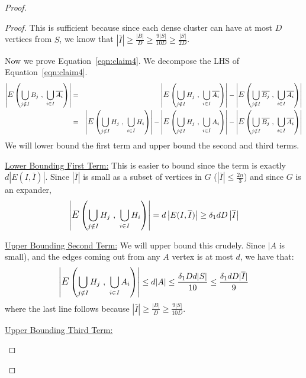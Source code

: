 \begin{proof}
\begin{description}
\begin{proof}
This is sufficient because since each dense cluster can have at most $D$ vertices from $S$, we know that $|\bar{I}| \ge \frac{|B|}{D} \ge \frac{9|S|}{10D} \ge \frac{|S|}{2D}$.

Now we prove Equation~\ref{eqn:claim4}. We decompose the LHS of Equation~\ref{eqn:claim4}.
\begin{eqnarray*}
\left| \mathlarger{E}\left(\bigcup_{j \notin I} B_j~,~\bigcup_{i \in I} \bar{A_i} \right) \right| & = &
\left| \mathlarger{E}\left(\bigcup_{j \notin I} H_j~,~\bigcup_{i \in I} \bar{A_i} \right) \right| -
\left| \mathlarger{E}\left(\bigcup_{j \notin I} \bar{B_j} ~,~\bigcup_{i \in I} \bar{A_i} \right) \right|\\
&=& 
\left| \mathlarger{E}\left(\bigcup_{j \notin I} H_j~,~\bigcup_{i \in I} H_i \right) \right|-
\left| \mathlarger{E}\left(\bigcup_{j \notin I} H_j~,~\bigcup_{i \in I} A_i
 \right) \right| - 
\left| \mathlarger{E}\left(\bigcup_{j \notin I} \bar{B_j} ~,~\bigcup_{i \in I} \bar{A_i} \right) \right|
\end{eqnarray*}
We will lower bound the first term and upper bound the second and third terms.
\begin{description}
\item{\underline{\sf Lower Bounding First Term:}}
This is easier to bound since the term is exactly $d\left|E(I,\bar{I})\right|$. Since $\left|\bar{I}\right|$ is small as a subset of vertices in $G$ ($\left|\bar{I}\right| \le \frac{2n}{3}$)
and since $G$ is an expander, 
$$\left| \mathlarger{E}\left(\bigcup_{j \notin I} H_j~,~\bigcup_{i \in I} H_i \right) \right| = d\left|E(I,\bar{I})\right| \ge \delta_1 d D \left|\bar{I}\right|$$
\item{\underline{\sf Upper Bounding Second Term:}}
We will upper bound this crudely. Since $|A$ is small), and the edges coming out from any $A$ vertex is at most $d$, we have that:
$$\left| \mathlarger{E}\left(\bigcup_{j \notin I} H_j~,~\bigcup_{i \in I} A_i \right) \right| \le d|A| \le \frac{\delta_1 D d |S|}{10} \le \frac{\delta_1 d D |\bar{I}|}{9}$$
where the last line follows because $|\bar{I}| \ge \frac{|B|}{D} \ge \frac{9|S|}{10D}$.

\item{\underline{\sf Upper Bounding Third Term:}}


\end{description}
\end{proof}
\end{description}
\end{proof}
